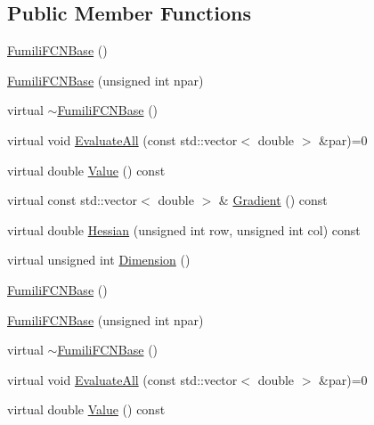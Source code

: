 \subsection*{Public Member Functions}
\begin{DoxyCompactItemize}
\item 
\mbox{\hyperlink{classROOT_1_1Minuit2_1_1FumiliFCNBase_a118a4f34ec003713b719671842f5c6a2}{Fumili\+F\+C\+N\+Base}} ()
\item 
\mbox{\hyperlink{classROOT_1_1Minuit2_1_1FumiliFCNBase_ad20bc861c81429cd75a0b14d5449f066}{Fumili\+F\+C\+N\+Base}} (unsigned int npar)
\item 
virtual \mbox{\hyperlink{classROOT_1_1Minuit2_1_1FumiliFCNBase_a94961223a3baa0a131461be70a55a4e3}{$\sim$\+Fumili\+F\+C\+N\+Base}} ()
\item 
virtual void \mbox{\hyperlink{classROOT_1_1Minuit2_1_1FumiliFCNBase_a0741bb4a7405cc33ab60583472a189cb}{Evaluate\+All}} (const std\+::vector$<$ double $>$ \&par)=0
\item 
virtual double \mbox{\hyperlink{classROOT_1_1Minuit2_1_1FumiliFCNBase_a221dacee0ccde747a271a0cecd759f98}{Value}} () const
\item 
virtual const std\+::vector$<$ double $>$ \& \mbox{\hyperlink{classROOT_1_1Minuit2_1_1FumiliFCNBase_ad226939ea2e83f754b5a6afc30876d3e}{Gradient}} () const
\item 
virtual double \mbox{\hyperlink{classROOT_1_1Minuit2_1_1FumiliFCNBase_ade134d8c6613393e942ef98d445db376}{Hessian}} (unsigned int row, unsigned int col) const
\item 
virtual unsigned int \mbox{\hyperlink{classROOT_1_1Minuit2_1_1FumiliFCNBase_ab8056ffdfd619915e22f1310db0644a6}{Dimension}} ()
\item 
\mbox{\hyperlink{classROOT_1_1Minuit2_1_1FumiliFCNBase_a118a4f34ec003713b719671842f5c6a2}{Fumili\+F\+C\+N\+Base}} ()
\item 
\mbox{\hyperlink{classROOT_1_1Minuit2_1_1FumiliFCNBase_ad20bc861c81429cd75a0b14d5449f066}{Fumili\+F\+C\+N\+Base}} (unsigned int npar)
\item 
virtual \mbox{\hyperlink{classROOT_1_1Minuit2_1_1FumiliFCNBase_a94961223a3baa0a131461be70a55a4e3}{$\sim$\+Fumili\+F\+C\+N\+Base}} ()
\item 
virtual void \mbox{\hyperlink{classROOT_1_1Minuit2_1_1FumiliFCNBase_a0741bb4a7405cc33ab60583472a189cb}{Evaluate\+All}} (const std\+::vector$<$ double $>$ \&par)=0
\item 
virtual double \mbox{\hyperlink{classROOT_1_1Minuit2_1_1FumiliFCNBase_a221dacee0ccde747a271a0cecd759f98}{Value}} () const

\end{DoxyCompactItemize}
